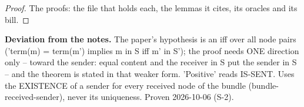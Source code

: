 \begin{lem}\label{thm:bundle-minimal-sent}
%
%
\end{lem}
%
\begin{proof}
%
The proofs: the file that holds each, the lemmas it cites, its oracles and its bill.
%
%
%
%
\end{proof}
%
\noindent\textbf{Deviation from the notes.} The paper's hypothesis is an iff over all node pairs ('term(m) = term(m') implies m in S iff m' in S'); the proof needs ONE direction only -- toward the sender: equal content and the receiver in S put the sender in S -- and the theorem is stated in that weaker form. 'Positive' reads IS-SENT. Uses the EXISTENCE of a sender for every received node of the bundle (bundle-received-sender), never its uniqueness. Proven 2026-10-06 (S-2).
